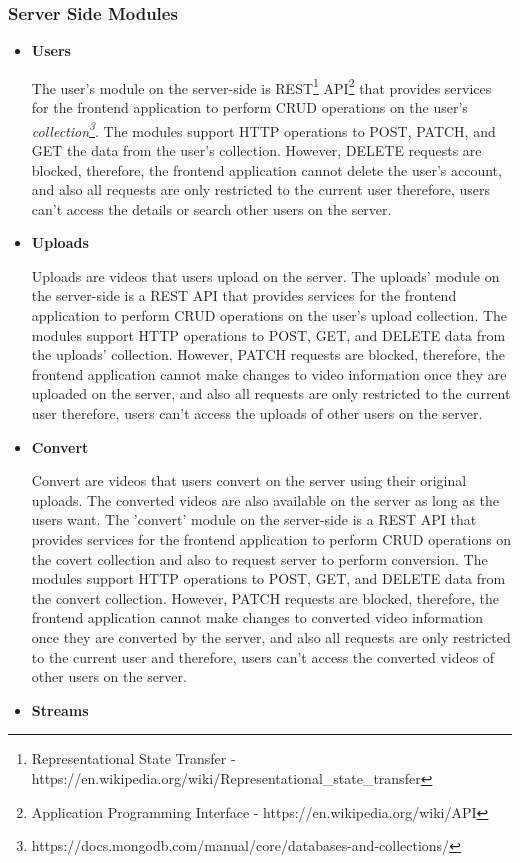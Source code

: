 		\subsubsection{Server Side Modules}
		\vs
		\begin{itemize}
			
			\item
			\large\textbf{Users}
			
			\hspace{2cm}The user's module on the server-side is REST\footnote{Representational State Transfer - https://en.wikipedia.org/wiki/Representational\_state\_transfer} API\footnote{Application Programming Interface - https://en.wikipedia.org/wiki/API} that provides services for the frontend application to perform CRUD operations on the user's {\em collection\footnote{https://docs.mongodb.com/manual/core/databases-and-collections/}}. The modules support HTTP operations to POST, PATCH, and GET the data from the user's collection. However,  DELETE requests are blocked, therefore, the frontend application cannot delete the user's account, and also all requests are only restricted to the current user therefore, users can't access the details or search other users on the server.
			\vs
			\item
			\large\textbf{Uploads}
			
			\hspace{2cm}Uploads are videos that users upload on the server. The uploads' module on the server-side is a REST API that provides services for the frontend application to perform CRUD operations on the user's upload collection. The modules support HTTP operations to POST, GET, and DELETE data from the uploads' collection. However,  PATCH requests are blocked, therefore, the frontend application cannot make changes to video information once they are uploaded on the server, and also all requests are only restricted to the current user therefore, users can't access the uploads of other users on the server.
			\vs	
			\item
			\large\textbf{Convert}
			
			\hspace{2cm}Convert are videos that users convert on the server using their original uploads. The converted videos are also available on the server as long as the users want. The 'convert' module on the server-side is a REST API that provides services for the frontend application to perform CRUD operations on the covert collection and also to request server to perform conversion. The modules support HTTP operations to POST, GET, and DELETE data from the convert collection. However,  PATCH requests are blocked, therefore, the frontend application cannot make changes to converted video information once they are converted by the server, and also all requests are only restricted to the current user and therefore, users can't access the converted videos of other users on the server.
			\vfill
			\pagebreak
			\item
			\large\textbf{Streams}
			

\end{itemize}
